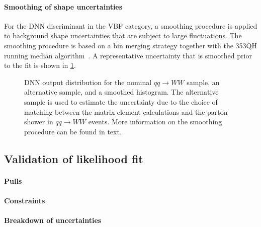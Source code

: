 \paragraph{Smoothing of shape uncertainties}
For the DNN discriminant in the VBF category, a smoothing procedure is applied to background shape uncertainties that are subject to large fluctuations. 
The smoothing procedure is based on a bin merging strategy together with the 353QH running median algorithm~\cite{Friedman353QH}. 
A representative uncertainty that is smoothed prior to the fit is shown in \cref{fig:dnn:smoothing}.
\begin{figure}[th]
    \centering
    {\caption{DNN output distribution for the nominal $qq \to WW$ sample, an alternative sample, and a smoothed histogram. The alternative sample is used to estimate the uncertainty due to the choice of matching between the matrix element calculations and the parton shower in $qq \to WW$ events. More information on the smoothing procedure can be found in text.
    \label{fig:dnn:smoothing} }}
\end{figure}

\subsection{Validation of likelihood fit}
\paragraph{Pulls}
\paragraph{Constraints}
\paragraph{Breakdown of uncertainties}




